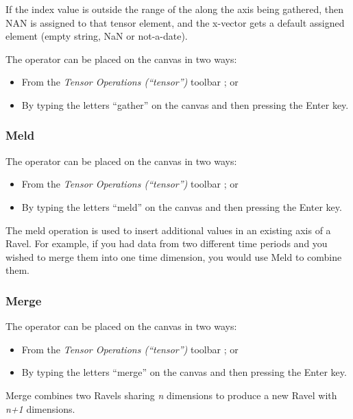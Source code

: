 If the index value is outside the range of the
 along the axis being gathered, then NAN
is assigned to that tensor element, and the x-vector gets a default
assigned element (empty string, NaN or not-a-date).

The operator can be placed on the canvas in two ways:
\begin{itemize}
\item From the \emph{Tensor Operations (``tensor'')} toolbar ;
or 
\item By typing the letters ``gather'' on the canvas and then pressing the
Enter key.
\end{itemize}


\subsubsection{Meld}

\label{Operation:meld}


The operator can be placed on the canvas in two ways:
\begin{itemize}
\item From the \emph{Tensor Operations (``tensor'')} toolbar ;
or 
\item By typing the letters ``meld'' on the canvas and then pressing the
Enter key.
\end{itemize}
The meld operation is used to insert additional values in an existing
axis of a Ravel. For example, if you had data from two different time
periods and you wished to merge them into one time dimension, you
would use Meld to combine them.

\subsubsection{Merge}

\label{Operation:merge}


The operator can be placed on the canvas in two ways:
\begin{itemize}
\item From the \emph{Tensor Operations (``tensor'')} toolbar ;
or 
\item By typing the letters ``merge'' on the canvas and then pressing the
Enter key.
\end{itemize}
Merge combines two Ravels sharing \emph{n} dimensions to produce a
new Ravel with \emph{n+1} dimensions.

